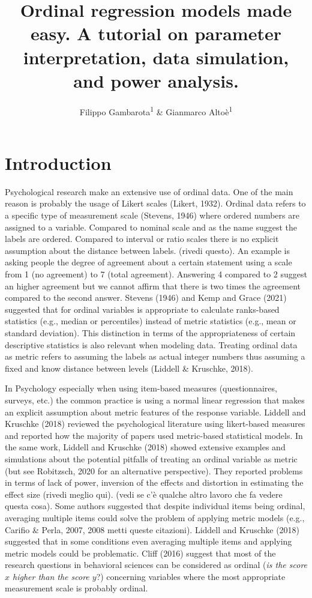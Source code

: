 \documentclass[
  man,floatsintext]{apa6}
\title{Ordinal regression models made easy. A tutorial on parameter interpretation, data simulation, and power analysis.}
\author{Filippo Gambarota\textsuperscript{1} \& Gianmarco Altoè\textsuperscript{1}}
\date{}
\affiliation{\vspace{0.5cm}\textsuperscript{1} Department of Developmental Psychology and Socialization, University of Padova, Italy}
\begin{document}
\maketitle

\section{Introduction}\label{introduction}

Psychological research make an extensive use of ordinal data. One of the main reason is probably the usage of Likert scales (Likert, 1932). Ordinal data refers to a specific type of measurement scale (Stevens, 1946) where ordered numbers are assigned to a variable. Compared to nominal scale and as the name suggest the labels are ordered. Compared to interval or ratio scales there is no explicit assumption about the distance between labels. (rivedi questo). An example is asking people the degree of agreement about a certain statement using a scale from 1 (no agreement) to 7 (total agreement). Answering 4 compared to 2 suggest an higher agreement but we cannot affirm that there is two times the agreement compared to the second answer. Stevens (1946) and Kemp and Grace (2021) suggested that for ordinal variables is appropriate to calculate ranks-based statistics (e.g., median or percentiles) instead of metric statistics (e.g., mean or standard deviation). This distinction in terms of the appropriateness of certain descriptive statistics is also relevant when modeling data. Treating ordinal data as metric refers to assuming the labels as actual integer numbers thus assuming a fixed and know distance between levels (Liddell \& Kruschke, 2018).

In Psychology especially when using item-based measures (questionnaires, surveys, etc.) the common practice is using a normal linear regression that makes an explicit assumption about metric features of the response variable. Liddell and Kruschke (2018) reviewed the psychological literature using likert-based measures and reported how the majority of papers used metric-based statistical models. In the same work, Liddell and Kruschke (2018) showed extensive examples and simulations about the potential pitfalls of treating an ordinal variable as metric (but see Robitzsch, 2020 for an alternative perspective). They reported problems in terms of lack of power, inversion of the effects and distortion in estimating the effect size (rivedi meglio qui). (vedi se c'è qualche altro lavoro che fa vedere questa cosa). Some authors suggested that despite individual items being ordinal, averaging multiple items could solve the problem of applying metric models (e.g., Carifio \& Perla, 2007, 2008 metti queste citazioni). Liddell and Kruschke (2018) suggested that in some conditions even averaging multiple items and applying metric models could be problematic. Cliff (2016) suggest that most of the research questions in behavioral sciences can be considered as ordinal (\emph{is the score \(x\) higher than the score \(y\)}?) concerning variables where the most appropriate measurement scale is probably ordinal.
\end{document}
